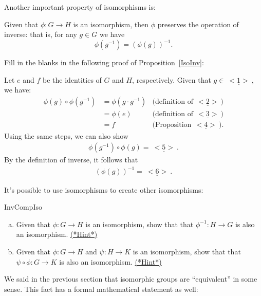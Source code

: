 Another important property of isomorphisms is:

\begin{thm}\label{IsoInv}
Given that  $\phi : G \rightarrow H$ is an  isomorphism, then $\phi$ preserves the operation of inverse: that is, for any $g \in G$ we have
\begin{equation*}
\phi(g^{-1}) = (\phi(g))^{-1}.
\end{equation*}
\end{thm}

\begin{exercise}{}
Fill in the blanks in the following proof of Proposition~\ref{IsoInv}:
\medskip

\noindent
Let $e$ and $f$ be the identities of $G$ and $H$, respectively. Given that $g \in \underline{~<1>~}$, we have:
\begin{align*}
\phi(g) \circ \phi(g^{-1}) &= \phi(g \cdot g^{-1}) & \textrm{(definition of}~\underline{~<2>~})\\
&= \phi(e) &\textrm{(definition of}~\underline{~<3>~})\\
&= f &\textrm{(Proposition}~\underline{~<4>~} ).
\end{align*}
Using the same steps, we can also show
\begin{align*}
\phi(g^{-1}) \circ \phi(g) = \underline{~<5>~}.
\end{align*}
By the definition of inverse, it follows that
\begin{align*}
( \phi(g))^{-1} = \underline{~<6>~}.
\end{align*}
\end{exercise} 

It's possible to use isomorphisms to create other isomorphisms:

\begin{exercise}{InvCompIso}
\begin{enumerate}[(a)]
\item
Given that  $\phi : G \rightarrow H$ is an  isomorphism, show that that  $\phi^{-1} : H \rightarrow G$ is also an  isomorphism.
\hyperref[sec:isomorph:hints]{(*Hint*)}
\item
Given that  $\phi : G \rightarrow H$ and $\psi : H \rightarrow K$ is an  isomorphism, show that that  $\psi \circ\phi:G \rightarrow K$ is also an  isomorphism.
\hyperref[sec:isomorph:hints]{(*Hint*)}
\end{enumerate}
\end{exercise}

We said in the previous section that isomorphic groups are ``equivalent'' in some sense. This fact has a formal mathematical statement as well:

